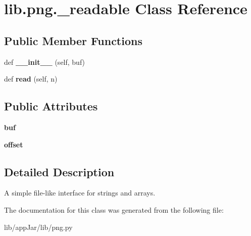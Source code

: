 \hypertarget{classlib_1_1png_1_1__readable}{}\section{lib.\+png.\+\_\+readable Class Reference}
\label{classlib_1_1png_1_1__readable}
\subsection*{Public Member Functions}
\begin{DoxyCompactItemize}
\item 
\mbox{\label{classlib_1_1png_1_1__readable_ae690fafc6ee20702b5179c2faa3b692a}} 
def {\bfseries \+\_\+\+\_\+init\+\_\+\+\_\+} (self, buf)
\item 
\mbox{\label{classlib_1_1png_1_1__readable_a6d4f58bafe3d9819511138542a7e72d2}} 
def {\bfseries read} (self, n)
\end{DoxyCompactItemize}
\subsection*{Public Attributes}
\begin{DoxyCompactItemize}
\item 
\mbox{\label{classlib_1_1png_1_1__readable_ab16bdcf4d2ced65b1c8872cd85ef590f}} 
{\bfseries buf}
\item 
\mbox{\label{classlib_1_1png_1_1__readable_ac2e7026fd026fb21a1933fd1e18a6062}} 
{\bfseries offset}
\end{DoxyCompactItemize}


\subsection{Detailed Description}
\begin{DoxyVerb}A simple file-like interface for strings and arrays.
\end{DoxyVerb}
 

The documentation for this class was generated from the following file\+:\begin{DoxyCompactItemize}
\item 
lib/app\+Jar/lib/png.\+py\end{DoxyCompactItemize}
